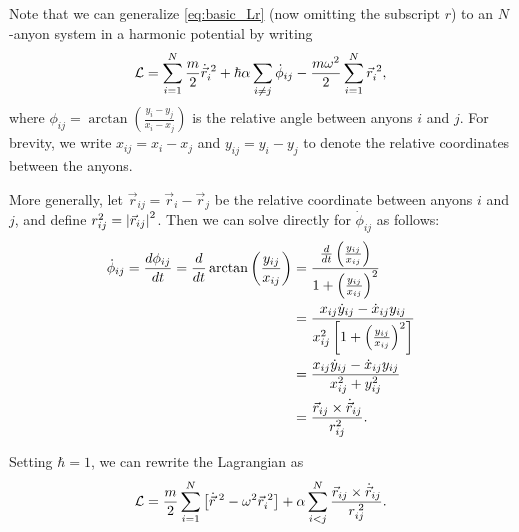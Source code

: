 Note that we can generalize \cref{eq:basic_Lr} (now omitting the subscript $r$) to an $N$-anyon system in a harmonic potential by writing
\begin{equation}
    \mathcal{L} = \sum_{i=1}^{N}\frac{m}{2}\dot{\vec{r}}_i^{\;2} + \hbar\alpha\sum_{i\neq j}\dot{\phi}_{ij} - \frac{m\omega^2}{2}\sum_{i=1}^{N}{\vec{r}_i}^{\;2},
\end{equation}
where $\phi_{ij} = \arctan\left( \frac{y_i-y_j}{x_i-x_j} \right)$ is the relative angle between anyons $i$ and $j$. For brevity, we write $x_{ij} = x_i-x_j$ and $y_{ij} = y_i-y_j$ to denote the relative coordinates between the anyons.

More generally, let $\vec{r}_{ij} = \vec{r}_i - \vec{r}_j$ be the relative coordinate between anyons $i$ and $j$, and define $r_{ij}^2 = \left|{\vec{r}_{ij}}\right|^2$. Then we can solve directly for $\dot{\phi}_{ij}$ as follows:
\begin{align*}
    \dot{\phi}_{ij} = \frac{d\phi_{ij}}{dt} = \frac{d}{dt}\arctan\left( \frac{y_{ij}}{x_{ij}} \right)
        &= \frac{\frac{d}{dt}\left( \frac{y_{ij}}{x_{ij}} \right)}{1+{\left( \frac{y_{ij}}{x_{ij}} \right)}^2} \\
        &= \frac{x_{ij}\dot{y}_{ij} - \dot{x}_{ij}y_{ij}}{x_{ij}^2\left[ 1+{\left( \frac{y_{ij}}{x_{ij}} \right)}^2 \right]} \\
        &= \frac{x_{ij}\dot{y}_{ij} - \dot{x}_{ij}y_{ij}}{x_{ij}^2 + y_{ij}^2} \\
        &= \frac{\vec{r}_{ij}\times\dot{\vec{r}}_{ij}}{r_{ij}^2}.
\end{align*}

Setting $\hbar=1$, we can rewrite the Lagrangian as~\cite{Date2003}
\begin{equation}
    \mathcal{L} = \frac{m}{2}\sum_{i=1}^{N}\left[ \dot{\vec{r}}^{\;2} - \omega^2\vec{r}_i^{\;2} \right] + \alpha\sum_{i<j}^{N}\frac{\vec{r}_{ij}\times\dot{\vec{r}}_{ij}}{{r}_{ij}^{\;2}}.\label{eq:compact_L}
\end{equation}



